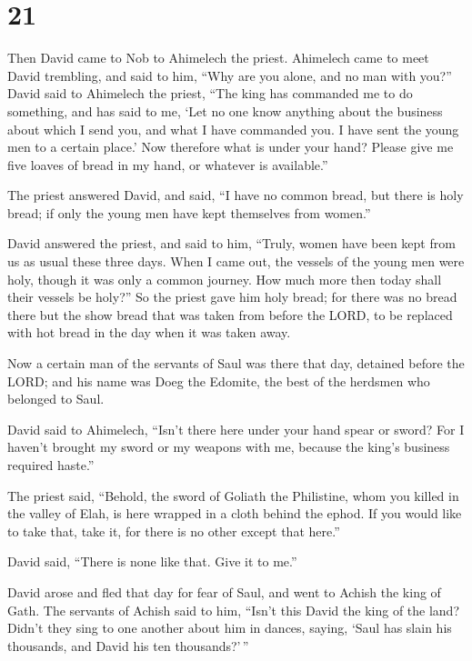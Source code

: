 \hypertarget{section-20}{%
\section{21}\label{section-20}}

 Then David came to Nob to Ahimelech the priest. Ahimelech
came to meet David trembling, and said to him, ``Why are you alone, and
no man with you?''  David said to Ahimelech the priest,
``The king has commanded me to do something, and has said to me, `Let no
one know anything about the business about which I send you, and what I
have commanded you. I have sent the young men to a certain place.'
 Now therefore what is under your hand? Please give me five
loaves of bread in my hand, or whatever is available.''

 The priest answered David, and said, ``I have no common
bread, but there is holy bread; if only the young men have kept
themselves from women.''

 David answered the priest, and said to him, ``Truly, women
have been kept from us as usual these three days. When I came out, the
vessels of the young men were holy, though it was only a common journey.
How much more then today shall their vessels be holy?''  So
the priest gave him holy bread; for there was no bread there but the
show bread that was taken from before the LORD, to be replaced with hot
bread in the day when it was taken away.

 Now a certain man of the servants of Saul was there that
day, detained before the LORD; and his name was Doeg the Edomite, the
best of the herdsmen who belonged to Saul.

 David said to Ahimelech, ``Isn't there here under your hand
spear or sword? For I haven't brought my sword or my weapons with me,
because the king's business required haste.''

 The priest said, ``Behold, the sword of Goliath the
Philistine, whom you killed in the valley of Elah, is here wrapped in a
cloth behind the ephod. If you would like to take that, take it, for
there is no other except that here.''

David said, ``There is none like that. Give it to me.''

 David arose and fled that day for fear of Saul, and went
to Achish the king of Gath.  The servants of Achish said to
him, ``Isn't this David the king of the land? Didn't they sing to one
another about him in dances, saying, `Saul has slain his thousands, and
David his ten thousands?'\,''

